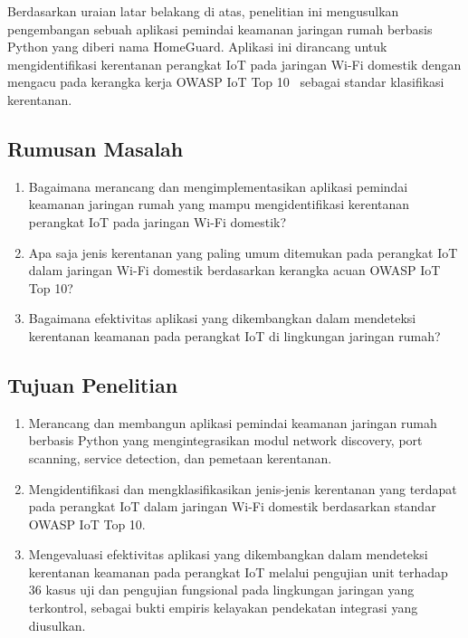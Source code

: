 Berdasarkan uraian latar belakang di atas, penelitian ini mengusulkan
pengembangan sebuah aplikasi pemindai keamanan jaringan rumah berbasis Python
yang diberi nama HomeGuard. Aplikasi ini dirancang untuk mengidentifikasi
kerentanan perangkat IoT pada jaringan Wi-Fi domestik dengan mengacu pada
kerangka kerja OWASP IoT Top 10~\cite{b9} sebagai standar klasifikasi
kerentanan.

\subsection{Rumusan Masalah}
\begin{enumerate}
    \item Bagaimana merancang dan mengimplementasikan aplikasi pemindai
    keamanan jaringan rumah yang mampu mengidentifikasi kerentanan perangkat
    IoT pada jaringan Wi-Fi domestik?
    \item Apa saja jenis kerentanan yang paling umum ditemukan pada perangkat
    IoT dalam jaringan Wi-Fi domestik berdasarkan kerangka acuan OWASP IoT
    Top 10?
    \item Bagaimana efektivitas aplikasi yang dikembangkan dalam mendeteksi
    kerentanan keamanan pada perangkat IoT di lingkungan jaringan rumah?
\end{enumerate}

\subsection{Tujuan Penelitian}
\begin{enumerate}
    \item Merancang dan membangun aplikasi pemindai keamanan jaringan rumah
    berbasis Python yang mengintegrasikan modul network discovery, port
    scanning, service detection, dan pemetaan kerentanan.
    \item Mengidentifikasi dan mengklasifikasikan jenis-jenis kerentanan yang
    terdapat pada perangkat IoT dalam jaringan Wi-Fi domestik berdasarkan
    standar OWASP IoT Top 10.
    \item Mengevaluasi efektivitas aplikasi yang dikembangkan dalam mendeteksi
    kerentanan keamanan pada perangkat IoT melalui pengujian unit terhadap 36
    kasus uji dan pengujian fungsional pada lingkungan jaringan yang
    terkontrol, sebagai bukti empiris kelayakan pendekatan integrasi yang
    diusulkan.
\end{enumerate}

